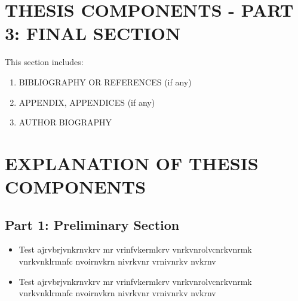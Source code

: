 \section{THESIS COMPONENTS - PART 3: FINAL SECTION}

This section includes:
\begin{enumerate}
    \item BIBLIOGRAPHY OR REFERENCES (if any)
    \item APPENDIX, APPENDICES (if any)
    \item AUTHOR BIOGRAPHY
\end{enumerate}

\section{EXPLANATION OF THESIS COMPONENTS}

\subsection*{Part 1: Preliminary Section}

\begin{itemize}
    \item Test ajrvbrjvnkrnvkrv mr vrinfvkermlcrv vnrkvnrolvcnrkvnrmk vnrkvnklrmnfc nvoirnvkrn nivrkvnr  vrnivnrkv nvkrnv
    \item Test ajrvbrjvnkrnvkrv mr vrinfvkermlcrv vnrkvnrolvcnrkvnrmk vnrkvnklrmnfc nvoirnvkrn nivrkvnr  vrnivnrkv nvkrnv
\end{itemize}

